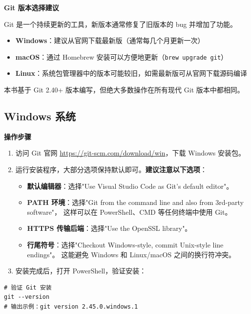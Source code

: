 \documentclass[12pt,a4paper,openany]{ctexbook}
\newenvironment{stepbox}{%
  \medskip
  \noindent\textbf{\faCogs\; 操作步骤}
  \smallskip
}{%
  \medskip
}
\begin{document}
\begin{infobox}
\textbf{Git 版本选择建议}

Git 是一个持续更新的工具，新版本通常修复了旧版本的 bug 并增加了功能。
\begin{itemize}
  \item \textbf{Windows}：建议从官网下载最新版（通常每几个月更新一次）
  \item \textbf{macOS}：通过 Homebrew 安装可以方便地更新（\texttt{brew upgrade git}）
  \item \textbf{Linux}：系统包管理器中的版本可能较旧，如需最新版可从官网下载源码编译
\end{itemize}

本书基于 Git 2.40+ 版本编写，但绝大多数操作在所有现代 Git 版本中都相同。
\end{infobox}

\subsection{Windows 系统}

\begin{stepbox}
\begin{enumerate}[leftmargin=1.5em]
  \item 访问 Git 官网 \url{https://git-scm.com/download/win}，下载 Windows 安装包。
  \item 运行安装程序，大部分选项保持默认即可。\textbf{建议注意以下选项}：
  \begin{itemize}
    \item \textbf{默认编辑器}：选择"Use Visual Studio Code as Git's default editor"。
    \item \textbf{PATH 环境}：选择"Git from the command line and also from 3rd-party software"，
          这样可以在 PowerShell、CMD 等任何终端中使用 Git。
    \item \textbf{HTTPS 传输后端}：选择"Use the OpenSSL library"。
    \item \textbf{行尾符号}：选择"Checkout Windows-style, commit Unix-style line endings"。
          这能避免 Windows 和 Linux/macOS 之间的换行符冲突。
  \end{itemize}
  \item 安装完成后，打开 PowerShell，验证安装：
\end{enumerate}
\end{stepbox}

\begin{lstlisting}[style=shell]
# 验证 Git 安装
git --version
# 输出示例：git version 2.45.0.windows.1
\end{lstlisting}
\end{document}
